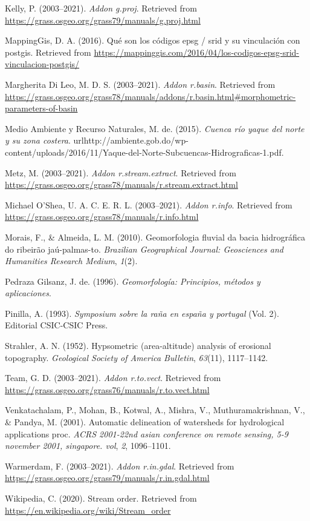 \documentclass[11pt,]{article}
\begin{document}
\hypertarget{ref-gproj}{}
Kelly, P. (2003--2021). \emph{Addon g.proj}. Retrieved from
\url{https://grass.osgeo.org/grass79/manuals/g.proj.html}

\hypertarget{ref-EPSG}{}
MappingGis, D. A. (2016). Qué son los códigos epsg / srid y su
vinculación con postgis. Retrieved from
\url{https://mappinggis.com/2016/04/los-codigos-epsg-srid-vinculacion-postgis/}

\hypertarget{ref-basinmargherita}{}
Margherita Di Leo, M. D. S. (2003--2021). \emph{Addon r.basin}.
Retrieved from
\url{https://grass.osgeo.org/grass78/manuals/addons/r.basin.html\#morphometric-parameters-of-basin}

\hypertarget{ref-Mmar2015cuenca}{}
Medio Ambiente y Recurso Naturales, M. de. (2015). \emph{Cuenca río
yaque del norte y su zona costera}.
urlhttp://ambiente.gob.do/wp-content/uploads/2016/11/Yaque-del-Norte-Subcuencas-Hidrograficas-1.pdf.

\hypertarget{ref-streamnextractmarkus}{}
Metz, M. (2003--2021). \emph{Addon r.stream.extract}. Retrieved from
\url{https://grass.osgeo.org/grass78/manuals/r.stream.extract.html}

\hypertarget{ref-rinfo}{}
Michael O'Shea, U. A. C. E. R. L. (2003--2021). \emph{Addon r.info}.
Retrieved from \url{https://grass.osgeo.org/grass78/manuals/r.info.html}

\hypertarget{ref-morais2010geomorfologia}{}
Morais, F., \& Almeida, L. M. (2010). Geomorfologia fluvial da bacia
hidrográfica do ribeirão jaú-palmas-to. \emph{Brazilian Geographical
Journal: Geosciences and Humanities Research Medium}, \emph{1}(2).

\hypertarget{ref-pedraza1996geomorfologia}{}
Pedraza Gilsanz, J. de. (1996). \emph{Geomorfología: Principios, métodos
y aplicaciones}.

\hypertarget{ref-pinilla1993symposium}{}
Pinilla, A. (1993). \emph{Symposium sobre la raña en españa y portugal}
(Vol. 2). Editorial CSIC-CSIC Press.

\hypertarget{ref-strahler1952hypsometric}{}
Strahler, A. N. (1952). Hypsometric (area-altitude) analysis of
erosional topography. \emph{Geological Society of America Bulletin},
\emph{63}(11), 1117--1142.

\hypertarget{ref-tovect}{}
Team, G. D. (2003--2021). \emph{Addon r.to.vect}. Retrieved from
\url{https://grass.osgeo.org/grass76/manuals/r.to.vect.html}

\hypertarget{ref-venkatachalam2001automatic}{}
Venkatachalam, P., Mohan, B., Kotwal, A., Mishra, V., Muthuramakrishnan,
V., \& Pandya, M. (2001). Automatic delineation of watersheds for
hydrological applications proc. \emph{ACRS 2001-22nd asian conference on
remote sensing, 5-9 november 2001, singapore. vol}, \emph{2},
1096--1101.

\hypertarget{ref-ringdal}{}
Warmerdam, F. (2003--2021). \emph{Addon r.in.gdal}. Retrieved from
\url{https://grass.osgeo.org/grass79/manuals/r.in.gdal.html}

\hypertarget{ref-wikipedia2020stream}{}
Wikipedia, C. (2020). Stream order. Retrieved from
\url{https://en.wikipedia.org/wiki/Stream_order}




\newpage
\singlespacing 
\end{document}
